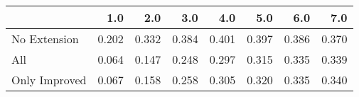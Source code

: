 \begin{tabular}{lrrrrrrr}
\toprule
{} &   1.0 &   2.0 &   3.0 &   4.0 &   5.0 &   6.0 &   7.0 \\
\midrule
No Extension  & 0.202 & 0.332 & 0.384 & 0.401 & 0.397 & 0.386 & 0.370 \\
All           & 0.064 & 0.147 & 0.248 & 0.297 & 0.315 & 0.335 & 0.339 \\
Only Improved & 0.067 & 0.158 & 0.258 & 0.305 & 0.320 & 0.335 & 0.340 \\
\bottomrule
\end{tabular}
